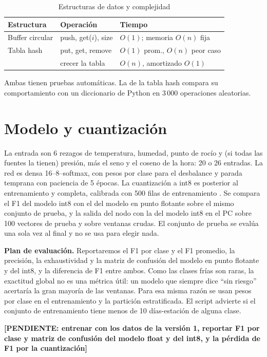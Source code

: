 \documentclass[conference]{IEEEtran}
\newcommand{\pend}[1]{\textcolor{red!70!black}{\textbf{[PENDIENTE: #1]}}}
\begin{document}
\begin{table}[t]
\caption{Estructuras de datos y complejidad}
\label{tab:ds}
\centering
\begin{tabular}{@{}lll@{}}
\toprule
Estructura & Operaci\'on & Tiempo \\
\midrule
Buffer circular & push, get($i$), size & $O(1)$; memoria $O(n)$ fija \\
Tabla hash & put, get, remove & $O(1)$ prom., $O(n)$ peor caso \\
 & crecer la tabla & $O(n)$, amortizado $O(1)$ \\
\bottomrule
\end{tabular}
\end{table}

Ambas tienen pruebas autom\'aticas. La de la tabla hash compara su comportamiento con un diccionario de Python en 3\,000 operaciones aleatorias.

\section{Modelo y cuantizaci\'on}
La entrada son 6 rezagos de temperatura, humedad, punto de roc\'io y (si todas las fuentes la tienen) presi\'on, m\'as el seno y el coseno de la hora: 20 o 26 entradas. La red es densa 16--8--softmax, con pesos por clase para el desbalance y parada temprana con paciencia de 5 \'epocas. La cuantizaci\'on a int8 es posterior al entrenamiento y completa, calibrada con 500 filas de entrenamiento \cite{jacob2018}. Se compara el F1 del modelo int8 con el del modelo en punto flotante sobre el mismo conjunto de prueba, y la salida del nodo con la del modelo int8 en el PC sobre 100 vectores de prueba y sobre ventanas crudas. El conjunto de prueba se eval\'ua una sola vez al final y no se usa para elegir nada.

\textbf{Plan de evaluaci\'on.} Reportaremos el F1 por clase y el F1 promedio, la precisi\'on, la exhaustividad y la matriz de confusi\'on del modelo en punto flotante y del int8, y la diferencia de F1 entre ambos. Como las clases fr\'ias son raras, la exactitud global no es una m\'etrica \'util: un modelo que siempre dice ``sin riesgo'' acertar\'ia la gran mayor\'ia de las ventanas. Para esa misma raz\'on se usan pesos por clase en el entrenamiento y la partici\'on estratificada. El script advierte si el conjunto de entrenamiento tiene menos de 10 d\'ias-estaci\'on de alguna clase.

\pend{entrenar con los datos de la versi\'on 1, reportar F1 por clase y matriz de confusi\'on del modelo float y del int8, y la p\'erdida de F1 por la cuantizaci\'on}
\end{document}
